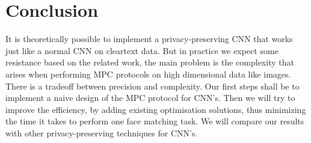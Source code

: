 \section{Conclusion}
It is theoretically possible to implement a privacy-preserving CNN that works just like a normal CNN on cleartext data. But in practice we expect some resistance based on the related work, the main problem is the complexity that arises when performing MPC protocols on high dimensional data like images. There is a tradeoff between precision and complexity. Our first steps shall be to implement a naive design of the MPC protocol for CNN's. Then we will try to improve the efficiency, by adding existing optimisation solutions, thus minimizing the time it takes to perform one face matching task. We will compare our results with other privacy-preserving techniques for CNN's.

